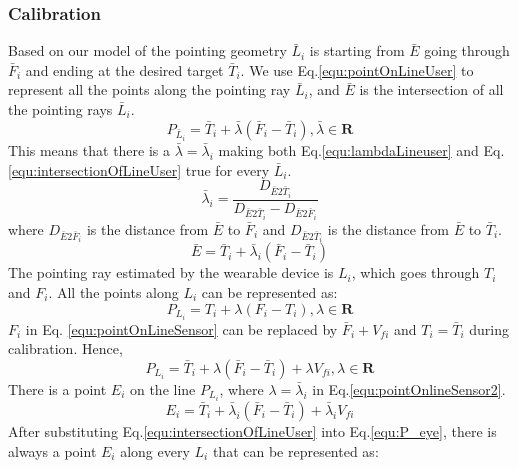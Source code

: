 \subsubsection{Calibration} \label{sec:4:PASTCalibration}
Based on our model of the pointing geometry $\bar L_i$ is starting from $\bar E$ going through $\bar F_i$ and ending at the desired target $\bar T_i$. We use Eq.\ref{equ:pointOnLineUser} to  represent all the points along the pointing ray $\bar L_i$, and $\bar E$ is the intersection of all the pointing rays $\bar L_i$. 
\begin{equation}  \label{equ:pointOnLineUser}
P_{\bar L_i} = {\bar T_i} + \bar\lambda ({\bar F_i} - {\bar T_i}) ,\bar\lambda \in \mathbf{R} 
\end{equation}
This means that there is a $\bar\lambda = \bar \lambda_i$ making both Eq.\ref{equ:lambdaLineuser} and Eq.\ref{equ:intersectionOfLineUser} true for every  $\bar L_i$.
\begin{equation} \label{equ:lambdaLineuser}
\bar\lambda_i = \frac {D_{\bar E2 \bar T_i}}{D_{\bar E2 \bar T_i} -D_{\bar E2 \bar F_i}} 
\end{equation}
where $D_{\bar E2 \bar F_i}$ is the distance from $\bar E$ to ${{\bar F_i}}$ and $D_{\bar E2 \bar T_i}$ is the distance from ${\bar E}$ to ${\bar T_i}$. 
\begin{equation} \label{equ:intersectionOfLineUser}
{\bar E} = {\bar T_i} + \bar\lambda_i ({\bar F_i} - {\bar T_i}) 
\end{equation}
The pointing ray estimated by the wearable device is $L_i$, which goes through  ${T_i}$ and $F_i$. All the points along $L_i$ can be represented as:
\begin{equation} \label{equ:pointOnLineSensor}
P_{L_i} = {T_i} + \lambda(F_i - {T_i}) , \lambda \in \mathbf{R}  
\end{equation}
$F_i$ in Eq. \ref{equ:pointOnLineSensor} can be replaced by ${\bar F_i} + V_{fi}$ and ${T_i} = {\bar T_i}$ during calibration. Hence,
\begin{equation} \label{equ:pointOnlineSensor2}
P_{L_i} = {\bar T_i} + \lambda({\bar F_i} - {\bar T_i}) + \lambda V_{fi}, \lambda \in \mathbf{R}  
\end{equation}
There is a point $E_i$ on the line $P_{L_i}$, where $\lambda = \bar\lambda_i$ in Eq.\ref{equ:pointOnlineSensor2}.
\begin{equation} \label{equ:P_eye}
E_i = {\bar T_i} + \bar\lambda_i({\bar F_i} - {\bar T_i}) + \bar\lambda_i V_{fi}  
\end{equation}
After substituting Eq.\ref{equ:intersectionOfLineUser} into Eq.\ref{equ:P_eye}, there is always a point $E_i$ along every $L_i$ that can be represented as:

